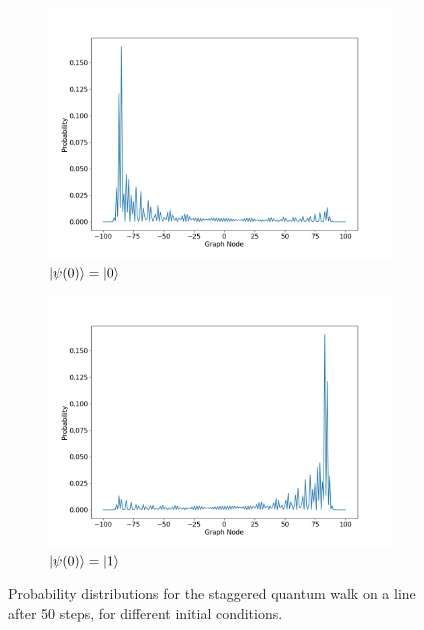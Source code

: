 \documentclass[../../main.tex]{subfiles}
\begin{document}
\begin{figure}[!h]
	\begin{subfigure}[h]{0.50\textwidth}
	\includegraphics[width=\linewidth]{img/Sec2/stagqwSingle0.png}
	\caption{$\ket{\psi(0)}=\ket{0}$}\label{fig:fig6}
	\end{subfigure}\hfill
	\begin{subfigure}[h]{0.50\textwidth}
	\includegraphics[width=\linewidth]{img/Sec2/stagqwSingle1.png}
	\caption{$\ket{\psi(0)}=\ket{1}$}\label{fig:fig7}
	\end{subfigure}\hfill
    \caption{Probability distributions for the staggered quantum walk on a line
    after 50 steps, for different initial conditions.}
    \label{fig:stagQW2InitCond}
\end{figure}\par
\end{document}
